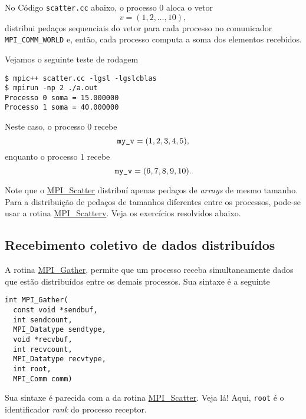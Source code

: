 \begin{ex}
  No Código \verb+scatter.cc+ abaixo, o processo 0 aloca o vetor
  \begin{equation}
    v = (1, 2, \dotsc, 10),
  \end{equation}
  distribui pedaços sequenciais do vetor para cada processo no comunicador \verb+MPI_COMM_WORLD+ e, então, cada processo computa a soma dos elementos recebidos.



  Vejamos o seguinte teste de rodagem
\begin{verbatim}
$ mpic++ scatter.cc -lgsl -lgslcblas
$ mpirun -np 2 ./a.out                                           
Processo 0 soma = 15.000000
Processo 1 soma = 40.000000
\end{verbatim}
  Neste caso, o processo 0 recebe
  \begin{equation}
    \verb+my_v+ = (1, 2, 3, 4, 5),
  \end{equation}
  enquanto o processo 1 recebe
  \begin{equation}
    \verb+my_v+ = (6, 7, 8, 9, 10).
  \end{equation}
\end{ex}

\begin{obs}
  Note que o \href{https://www.open-mpi.org/doc/current/man3/MPI\_Scatter.3.php}{MPI\_Scatter} distribuí apenas pedaços de {\it arrays} de mesmo tamanho. Para a distribuição de pedaços de tamanhos diferentes entre os processos, pode-se usar a rotina \href{https://www.open-mpi.org/doc/current/man3/MPI\_Scatterv.3.php}{MPI\_Scatterv}. Veja os exercícios resolvidos abaixo.
\end{obs}

\subsection {Recebimento coletivo de dados distribuídos}

A rotina \href{https://www.open-mpi.org/doc/current/man3/MPI\_Gather.3.php}{MPI\_Gather}, permite que um processo receba simultaneamente dados que estão distribuídos entre os demais processos. Sua sintaxe é a seguinte
\begin{verbatim}
int MPI_Gather(
  const void *sendbuf, 
  int sendcount, 
  MPI_Datatype sendtype,
  void *recvbuf, 
  int recvcount, 
  MPI_Datatype recvtype, 
  int root,
  MPI_Comm comm)
\end{verbatim}
Sua sintaxe é parecida com a da rotina \href{https://www.open-mpi.org/doc/current/man3/MPI\_Scatter.3.php}{MPI\_Scatter}. Veja lá! Aqui, \verb+root+ é o identificador {\it rank} do processo receptor.

